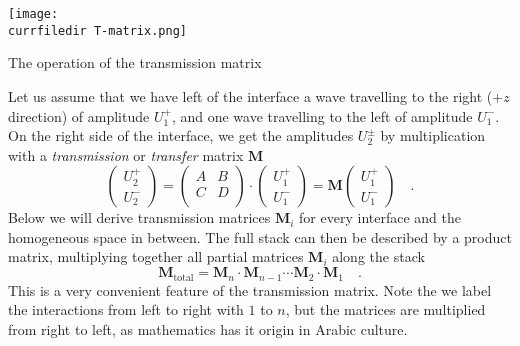 \begin{marginfigure}
\texttt{[image: \\currfiledir T-matrix.png]}

\caption{The operation of the transmission matrix
\label{fig:surface_T_matrix}}
\end{marginfigure}

Let us assume that we have left of the interface a wave travelling to the right ($+z$ direction) of amplitude $U_1^+$, and one wave travelling to the left of amplitude $U_1^-$. On the right side of the interface, we get the amplitudes $U_2^\pm$ by multiplication with a \emph{transmission} or \emph{transfer} matrix $\mathbf{M}$
\begin{equation}
\begin{pmatrix}
U_2^+ \\ U_2^-
\end{pmatrix}
= 
\begin{pmatrix}
A & B \\ C & D \\
\end{pmatrix}
\cdot
\begin{pmatrix}
U_1^+ \\ U_1^-
\end{pmatrix}
%
= \mathbf{M}
\begin{pmatrix}
U_1^+ \\ U_1^-
\end{pmatrix} \quad . \label{eq:def_T_matrix}
\end{equation}
Below we will derive transmission matrices $\mathbf{M}_i$ for every interface and the homogeneous space in between. The full stack can then be described by a product matrix, multiplying together all partial matrices $\mathbf{M}_i$ along the stack
\begin{equation}
\mathbf{M}_\text{total} = \mathbf{M}_n \cdot  \mathbf{M}_{n-1} \cdots\mathbf{M}_2 \cdot  \mathbf{M}_{1} \quad . 
\end{equation}
This is a very convenient feature of the transmission matrix.
Note the we label the interactions from left to right with $1$ to $n$, but the matrices are multiplied from right to left, as mathematics has it origin in Arabic culture.



